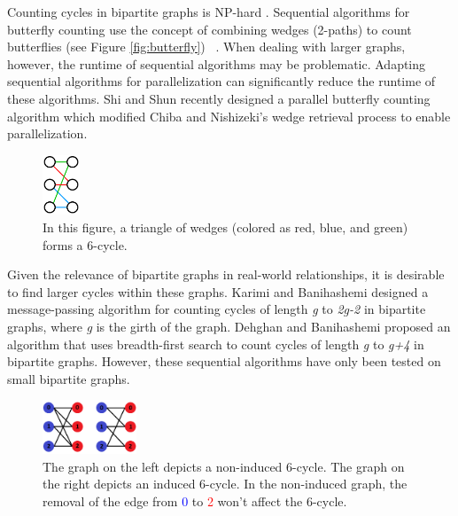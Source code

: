 \documentclass[11pt]{article}
\newcommand{\blue}[1]{\textcolor{blue}{#1}}
\newcommand{\red}[1]{\textcolor{red}{#1}}
\begin{document}
Counting cycles in bipartite graphs is NP-hard \cite{flum2004parameterized}.
Sequential algorithms for butterfly counting use the concept of combining wedges (2-paths) to count butterflies (see Figure \ref{fig:butterfly}) ~\cite{wang2014rectangle, sanei2018butterfly, chiba1985arboricity}.
When dealing with larger graphs, however, the runtime of sequential algorithms may be problematic.
Adapting sequential algorithms for parallelization can significantly reduce the runtime of these algorithms.
Shi and Shun \cite{shi2019parallel} recently designed a parallel butterfly counting algorithm which modified Chiba and Nishizeki's wedge retrieval process \cite{chiba1985arboricity} to enable parallelization.

\begin{figure}[h]
    \centering
    \includegraphics[width=0.1\textwidth]{figures/Triangle.png}
    \caption{\small In this figure, a triangle of wedges (colored as red, blue, and green) forms a 6-cycle.}
    \label{fig:triangle}
\end{figure}

Given the relevance of bipartite graphs in real-world relationships, it is desirable to find larger cycles within these graphs.
Karimi and Banihashemi \cite{karimi2012message} designed a message-passing algorithm for counting cycles of length \textit{g} to \textit{2g-2} in bipartite graphs, where \textit{g} is the girth of the graph.
Dehghan and Banihashemi \cite{dehghan2019counting} proposed an algorithm that uses breadth-first search to count cycles of length \textit{g}  to \textit{g+4} in bipartite graphs.
However, these sequential algorithms have only been tested on small bipartite graphs.

\begin{figure}[h]
    \centering
    \includegraphics[width=0.25\textwidth]{figures/Induced vs Noninduced.png}
    \caption{\small The graph on the left depicts a non-induced 6-cycle. The graph on the right depicts an induced 6-cycle. In the non-induced graph, the removal of the edge from \blue{0} to \red{2} won't affect the 6-cycle.}
    \label{fig:induced}
\end{figure}
\end{document}
